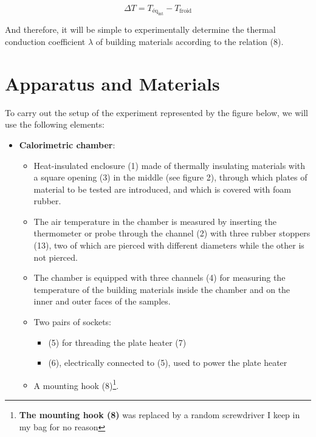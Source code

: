 \documentclass[12pt,a4paper,twoside]{article}
\begin{document}
\begin{equation}
\Delta T = T_{\text{éq}_{\text{int}}} - T_{\text{froid}}
\end{equation}

And therefore, it will be simple to experimentally determine the thermal conduction coefficient $\lambda$ of building materials according to the relation (8).


\section{Apparatus and Materials}

To carry out the setup of the experiment represented by the figure below, we will use the following elements:

\begin{itemize}

    \item \textbf{Calorimetric chamber}:
    \begin{itemize}
        \item Heat-insulated enclosure (1) made of thermally insulating materials with a square opening (3) in the middle (see figure 2), through which plates of material to be tested are introduced, and which is covered with foam rubber.
        
        \item The air temperature in the chamber is measured by inserting the thermometer or probe through the channel (2) with three rubber stoppers (13), two of which are pierced with different diameters while the other is not pierced.
        
        \item The chamber is equipped with three channels (4) for measuring the temperature of the building materials inside the chamber and on the inner and outer faces of the samples.
        
        \item Two pairs of sockets:
        \begin{itemize}
            \item (5) for threading the plate heater (7)
            \item (6), electrically connected to (5), used to power the plate heater
        \end{itemize}
        
        \item A mounting hook (8)\footnote{\textbf{The mounting hook (8)} was replaced by a random screwdriver I keep in my bag for no reason}.
        

\end{itemize}
\end{itemize}
\end{document}
